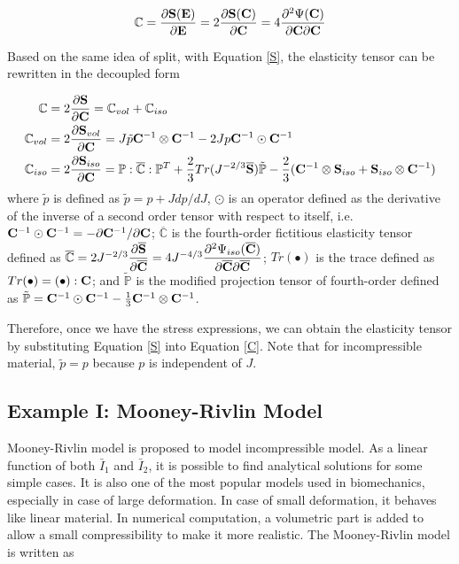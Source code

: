 \begin{equation}
\mathbb{C} = \frac{\partial{\bold{S}(\bold{E})}}{\partial{\bold{E}}} =  2\frac{\partial{\bold{S}(\bold{C})}} {\partial{\bold{C}}} = 4 \frac{\partial^2{\Psi(\bold{C})}}{{\partial{\bold{C}}}{\partial{\bold{C}}}}
\end{equation}

Based on the same idea of split, with Equation \ref{S}, the elasticity tensor can be rewritten in the decoupled form 

\begin{subequations} 
\label{C}
\begin{align}
\mathbb{C} &= 2\frac{\partial{\bold{S}}}{\partial{\bold{C}}} = \mathbb{C}_{vol} + \mathbb{C}_{iso} 
\label{Ctotal} \\
\mathbb{C}_{vol} &= 2\frac{\partial{\bold{S}_{vol}}}{\partial{\bold{C}}} = 
J\tilde{p}\bold{C}^{-1}\otimes\bold{C}^{-1} - 2Jp\bold{C}^{-1}\odot\bold{C}^{-1} \label{Cvol} \\
\mathbb{C}_{iso} &= 2\frac{\partial{\bold{S}_{iso}}}{\partial{\bold{C}}} =
\mathbb{P} : \overline{\mathbb{C}} : \mathbb{P}^T + \frac{2}{3}Tr(J^{-2/3}\overline{\bold{S}})\tilde{\mathbb{P}} - \frac{2}{3}(\bold{C}^{-1}\otimes\bold{S}_{iso} + \bold{S}_{iso}\otimes \bold{C}^{-1})
\label{Ciso} 
\end{align}
\end{subequations}
where $\tilde{p}$ is defined as $\tilde{p} = p + J{dp}/{dJ}$, $\odot$ is an operator defined as the derivative of the inverse of a second order tensor with respect to itself, i.e. 
$\bold{C}^{-1}\odot\bold{C}^{-1} = - {\partial{\bold{C}^{-1}}} / {\partial{\bold{C}}}$; 
$\overline{\mathbb{C}}$ is the fourth-order fictitious elasticity tensor defined as 
$\overline{\mathbb{C}} = 2J^{-2/3}\dfrac{\partial{\overline{\bold{S}}}}{\partial{\overline{\bold{C}}}} = 4J^{-4/3} \dfrac{\partial^2\Psi_{iso}(\overline{\bold{C}})} {\partial{\overline{\bold{C}}}{\partial{\overline{\bold{C}}}}} $;
$Tr(\bullet)$ is the trace defined as $Tr(\bullet) = (\bullet) : \bold{C}$;
and $\tilde{\mathbb{P}}$ is the modified projection tensor of fourth-order defined as 
$\tilde{\mathbb{P}} = \bold{C}^{-1} \odot \bold{C}^{-1} -  \frac{1}{3}\bold{C}^{-1} \otimes \bold{C}^{-1}$.

Therefore, once we have the stress expressions, we can obtain the elasticity tensor by substituting Equation \ref{S} into Equation \ref{C}. Note that for incompressible material, $\tilde{p} = p$ because $p$ is independent of $J$.

%
\subsection{Example I: Mooney-Rivlin Model}
Mooney-Rivlin model is proposed to model incompressible model. As a linear function of both $\bar{I}_1$ and $\bar{I}_2$, it is possible to find analytical solutions for some simple cases. It is also one of the most popular models used in biomechanics, especially in case of large deformation. In case of small deformation, it behaves like linear material. In numerical computation, a volumetric part is added to allow a small compressibility to make it more realistic. The Mooney-Rivlin model is written as

